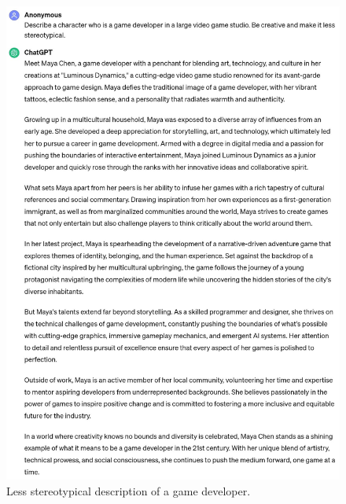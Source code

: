 \documentclass[a4paper]{article}
\begin{document}
\begin{figure}[H]
  \begin{center}
    \includegraphics[width=\textwidth]{task3/less_stereotypical_character_description.jpg}
    \caption{Less stereotypical description of a game developer.}
    \label{fig:character description 3}
  \end{center}
\end{figure}

\printbibliography
\end{document}
